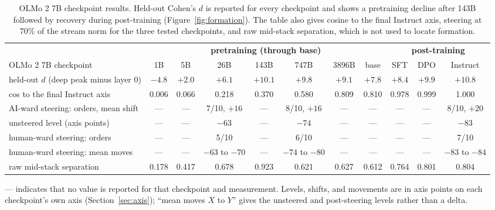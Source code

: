 \begin{table}[!ht]
\caption{OLMo 2 7B checkpoint results. Held-out Cohen's $d$ is reported for
every checkpoint and shows a pretraining decline after 143B followed by
recovery during post-training (Figure~\ref{fig:formation}). The table also gives cosine to the final Instruct
axis, steering at 70\% of the stream norm for the three tested checkpoints, and
raw mid-stack separation, which is not used to locate formation.}
\label{tab:formation}
\centering
\scriptsize
\setlength{\tabcolsep}{3pt}
\begin{tabular}{@{}lcccccccccc@{}}
\toprule
& \multicolumn{7}{c}{\textbf{pretraining (through base)}} & \multicolumn{3}{c}{\textbf{post-training}} \\
\cmidrule(lr){2-8}\cmidrule(lr){9-11}
OLMo 2 7B checkpoint & 1B & 5B & 26B & 143B & 747B & 3896B & base & SFT & DPO & Instruct \\
\midrule
held-out $d$ (deep peak minus layer 0) & $-4.8$ & $+2.0$ & $+6.1$ & $+10.1$ & $+9.8$ & $+9.1$ & $+7.8$ & $+8.4$ & $+9.9$ & $+10.8$ \\
cos to the final Instruct axis & 0.006 & 0.066 & 0.218 & 0.370 & 0.580 & 0.809 & 0.810 & 0.978 & 0.999 & 1.000 \\
AI-ward steering: orders, mean shift & --- & --- & 7/10, $+16$ & --- & 8/10, $+16$ & --- & --- & --- & --- & 8/10, $+20$ \\
unsteered level (axis points) & --- & --- & $-63$ & --- & $-74$ & --- & --- & --- & --- & $-83$ \\
human-ward steering: orders & --- & --- & 5/10 & --- & 6/10 & --- & --- & --- & --- & 7/10 \\
human-ward steering: mean moves & --- & --- & $-63$ to $-70$ & --- & $-74$ to $-80$ & --- & --- & --- & --- & $-83$ to $-84$ \\
raw mid-stack separation & 0.178 & 0.417 & 0.678 & 0.923 & 0.621 & 0.627 & 0.612 & 0.764 & 0.801 & 0.804 \\
\bottomrule
\end{tabular}
\par\smallskip
\begin{minipage}{\linewidth}\scriptsize
--- indicates that no value is reported for that checkpoint and measurement.
Levels, shifts, and movements are in axis points on each checkpoint's own axis
(Section~\ref{sec:axis}); ``mean moves $X$ to $Y$'' gives the unsteered and
post-steering levels rather than a delta.
\end{minipage}
\end{table}

